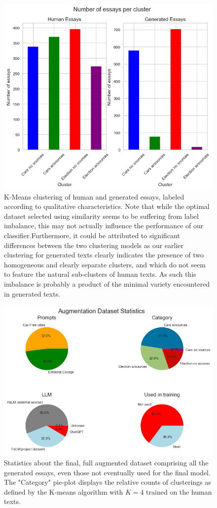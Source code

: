 \documentclass[11pt, a4paper]{article}
\begin{document}
	\begin{figure}
		\includegraphics[width=14cm]{clusters.png}
		\centering
		\caption{K-Means clustering of human and generated essays, labeled according to qualitative characteristics. Note that while the optimal dataset selected using similarity seems to be suffering from label imbalance, this may not actually influence the performance of our classifier.Furthermore, it could be attributed to significant differences between the two clustering models as our earlier clustering for generated texts clearly indicates the presence of two homogeneous and clearly separate clusters, and which do not seem to feature the natural sub-clusters of human texts. As such this imbalance is probably a product of the minimal variety encountered in generated texts.}
		\label{fig::clusters}
	\end{figure}
	
	\begin{figure}
		\includegraphics[width=14cm]{augmentation_stats.png}
		\centering
		\caption{Statistics about the final, full augmented dataset comprising all the generated essays, even those not eventually used for the final model. The "Category" pie-plot displays the relative counts of clusterings as defined by the K-means algorithm with $K=4$ trained on the human texts.}
		\label{fig::augmentation_stats}
	\end{figure}
\end{document}
